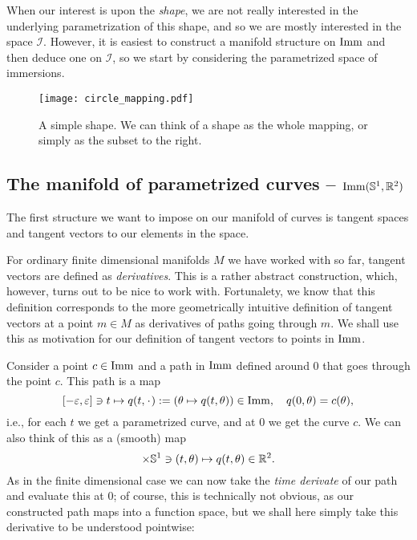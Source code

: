 When our interest is upon the \textit{shape}, we are not really interested in the underlying parametrization of this shape, and so we are mostly interested in the space $\mathcal{I}$. However, it is easiest to construct a manifold structure on $\mathop{}\!\mathrm{Imm}$ and then deduce one on $\mathcal{I}$, so we start by considering the parametrized space of immersions.

\begin{figure}
  \centerline{\texttt{[image: circle\_mapping.pdf]}}
  \caption{A simple shape. We can think of a shape as the whole
    mapping, or simply as the subset to the right.}
  \label{fig:circle-mapping}
\end{figure}

\subsection{The manifold of parametrized curves -- $\mathop{}\!\mathrm{Imm}(\mathbb{S}^1, \mathbb{R}^2)$}
\label{sec:parametrized-curves}

The first structure we want to impose on our manifold of curves is tangent spaces and tangent vectors to our elements in the space.

For ordinary finite dimensional manifolds $M$ we have worked with so far, tangent vectors are defined as \textit{derivatives}. This is a rather abstract construction, which, however, turns out to be nice to work with. Fortunalety, we know that this definition corresponds to the more geometrically intuitive definition of tangent vectors at a point $m \in M$ as derivatives of paths going through $m$. We shall use this as motivation for our definition of tangent vectors to points in $\mathop{}\!\mathrm{Imm}$.

Consider a point $c\in \mathop{}\!\mathrm{Imm}$ and a path in $\mathop{}\!\mathrm{Imm}$ defined around $0$ that goes through the point $c$. This path is a map
\begin{equation}
  \label{eq:path-in-imm}
  [-\epsilon, \epsilon] \ni t \mapsto  q(t, \blank) :=  (\theta\mapsto q(t, \theta)) \in \I,
  \quad q(0,\theta) = c(\theta),
\end{equation}
i.e., for each $t$ we get a parametrized curve, and at 0 we get the curve $c$. We can also think of this as a (smooth) map
\begin{equation*}
  [-\epsilon, \epsilon] \times \S^1  \ni (t, \theta) \mapsto q(t, \theta) \in \R^2.
\end{equation*}
As in the finite dimensional case we can now take the \textit{time derivate} of our path and evaluate this at 0; of course, this is technically not obvious, as our constructed path maps into a function space, but we shall here simply take this derivative to be understood pointwise:

